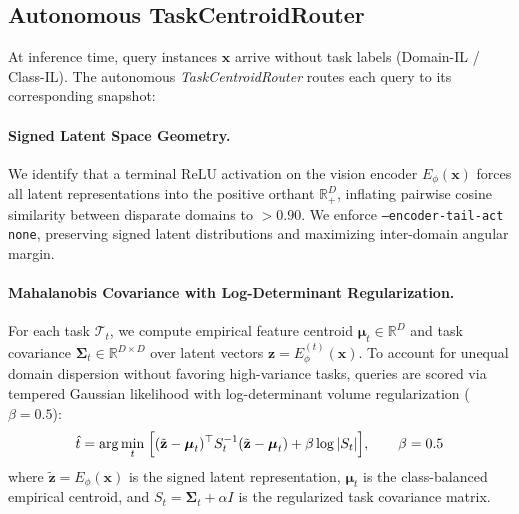 \documentclass[11pt, a4paper]{article}
\begin{document}
\subsection{Autonomous TaskCentroidRouter}

At inference time, query instances $\mathbf{x}$ arrive without task labels (Domain-IL / Class-IL). The autonomous \emph{TaskCentroidRouter} routes each query to its corresponding snapshot:

\paragraph{Signed Latent Space Geometry.}
We identify that a terminal ReLU activation on the vision encoder $E_\phi(\mathbf{x})$ forces all latent representations into the positive orthant $\mathbb{R}_+^D$, inflating pairwise cosine similarity between disparate domains to $>0.90$. We enforce \texttt{--encoder-tail-act none}, preserving signed latent distributions and maximizing inter-domain angular margin.

\paragraph{Mahalanobis Covariance with Log-Determinant Regularization.}
For each task $\mathcal{T}_t$, we compute empirical feature centroid $\boldsymbol{\mu}_t \in \mathbb{R}^D$ and task covariance $\boldsymbol{\Sigma}_t \in \mathbb{R}^{D \times D}$ over latent vectors $\mathbf{z} = E_\phi^{(t)}(\mathbf{x})$. To account for unequal domain dispersion without favoring high-variance tasks, queries are scored via tempered Gaussian likelihood with log-determinant volume regularization ($\beta = 0.5$):
\begin{equation}
    \hat{t} = \arg\min_{t} \; \Bigl[(\tilde{\mathbf{z}}-\boldsymbol{\mu}_t)^\top S_t^{-1} (\tilde{\mathbf{z}}-\boldsymbol{\mu}_t) + \beta \log|S_t|\Bigr], \qquad \beta = 0.5
    \label{eq:mahalanobis}
\end{equation}
where $\tilde{\mathbf{z}} = E_\phi(\mathbf{x})$ is the signed latent representation, $\boldsymbol{\mu}_t$ is the class-balanced empirical centroid, and $S_t = \boldsymbol{\Sigma}_t + \alpha I$ is the regularized task covariance matrix.
\end{document}
